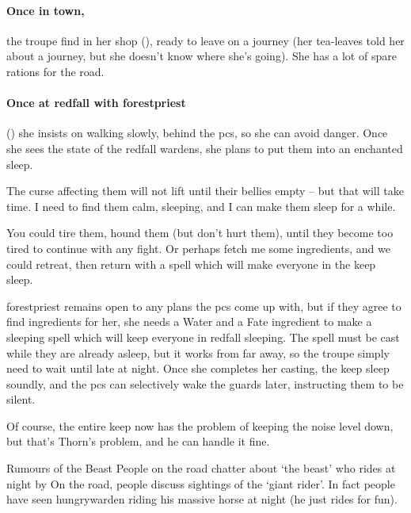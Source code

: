 \paragraph{Once in \gls{town},}
the troupe find  in her shop (), ready to leave on a journey (her tea-leaves told her about a journey, but she doesn't know where she's going).
She has a lot of spare \glspl{ration} for the road.

\paragraph{Once at \gls{redfall} with \gls{forestpriest}}
()
she insists on walking slowly, behind the \glspl{pc}, so she can avoid danger.
Once she sees the state of the \gls{redfall} \glspl{warden}, she plans to put them into an enchanted sleep.

\begin{speechtext}
  The curse affecting them will not lift until their bellies empty -- but that will take time.
  I need to find them calm, sleeping, and I can make them sleep for a while.

  You could tire them, hound them (but don't hurt them), until they become too tired to continue with any fight.
  Or perhaps fetch me some \glspl{ingredient}, and we could retreat, then return with a spell which will make everyone in the keep sleep.
\end{speechtext}

\Gls{forestpriest} remains open to any plans the \glspl{pc} come up with, but if they agree to find \glspl{ingredient} for her, she needs a Water and a Fate \gls{ingredient} to make a sleeping spell which will keep everyone in \gls{redfall} sleeping.
The spell must be cast while they are already asleep, but it works from far away, so the troupe simply need to wait until late at night.
Once she completes her \gls{casting}, the keep sleep soundly, and the \glspl{pc} can selectively wake the guards later, instructing them to be silent.

Of course, the entire keep now has the problem of keeping the noise level down, but that's Thorn's problem, and he can handle it fine.

{Rumours of the Beast}%
{People on the road chatter about `the beast' who rides at night by }%
On the road, people discuss sightings of the `giant rider'.
In fact people have seen \gls{hungrywarden} riding his massive horse at night (he just rides for fun).

